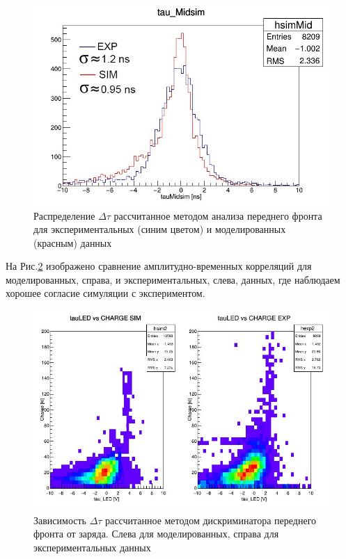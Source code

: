 \begin{figure}[!ht]
	\centering
	\includegraphics[width=0.8\linewidth]{tausim.png}
	\caption{Распределение $\Delta\tau$ рассчитанное методом анализа переднего фронта для экспериментальных (синим цветом) и моделированных (красным) данных}\label{ris:tausim}
\end{figure}

На Рис.\ref{ris:ampsim} изображено сравнение амплитудно-временных корреляций для моделированных, справа, и экспериментальных, слева, данных, где наблюдаем хорошее согласие симуляции с экспериментом. 

\begin{figure}
	\centering
	\includegraphics[width=\linewidth]{ampsim.png}
	\caption{Зависимость $\Delta\tau$ рассчитанное методом дискриминатора переднего фронта от заряда. Слева для моделированных, справа для экспериментальных данных }\label{ris:ampsim}
\end{figure}

